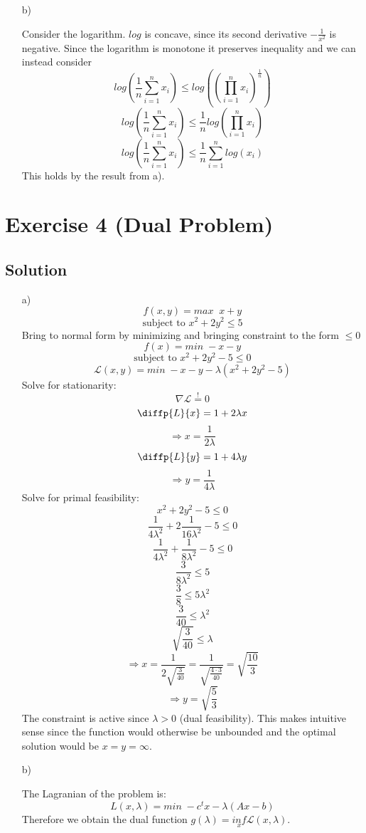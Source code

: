 \documentclass[10pt]{article}
\numberwithin{equation}{section}
\begin{document}
\begin{enumerate}
{}
\item[b)]{
    Consider the logarithm. $log$ is concave, since its second derivative $-\frac{1}{x^2}$ is negative.
    Since the logarithm is monotone it preserves inequality and we can instead consider
    $$log(\frac{1}{n} \sum_{i=1}^{n}x_i) \leq log((\prod_{i=1}^n x_i)^{\frac{1}{n}})$$
    $$log(\frac{1}{n} \sum_{i=1}^{n}x_i) \leq \frac{1}{n} log(\prod_{i=1}^n x_i)$$
    $$log(\frac{1}{n} \sum_{i=1}^{n}x_i) \leq \frac{1}{n} \sum_{i=1}^n log(x_i)$$
    This holds by the result from a).

}
\end{enumerate}

\section*{Exercise 4 (Dual Problem)}
\subsection*{Solution}
\begin{enumerate}
\item[a)]{
    $$ f(x, y) = max\;\; x+y$$
    $$\text{subject to } x^2 +2y^2 \leq 5$$
    Bring to normal form by minimizing and bringing constraint to the form $\leq 0$
    $$ f(x) = min\;  -x-y$$
    $$\text{subject to } x^2 + 2y^2 - 5 \leq 0$$
    $$\mathcal{L}(x,y) = min\; -x-y - \lambda (x^2 + 2y^2 -5)$$
    Solve for stationarity: 
    $$\nabla \mathcal{L} \overset{!}{=} 0$$
    $$\diffp{L}{x} = 1 + 2\lambda x$$
    $$\Rightarrow x  = \frac{1}{2\lambda}$$
    $$\diffp{L}{y} = 1 + 4\lambda y$$
    $$\Rightarrow y  = \frac{1}{4\lambda}$$
    Solve for primal feasibility:
    $$x^2 + 2y^2 -5 \leq 0$$
    $$\frac{1}{4\lambda^2} + 2\frac{1}{16\lambda^2} -5 \leq 0$$
    $$\frac{1}{4\lambda^2} + \frac{1}{8\lambda^2} -5 \leq 0$$
    $$\frac{3}{8\lambda^2}  \leq 5$$
    $$\frac{3}{8}  \leq 5\lambda^2$$
    $$\frac{3}{40}  \leq \lambda^2$$
    $$\sqrt{\frac{3}{40}} \leq \lambda$$
    $$\Rightarrow x = \frac{1}{2\sqrt{\frac{3}{40}}} = \frac{1}{\sqrt{\frac{4  \cdot 3}{40}}}= \sqrt{\frac{10}{3}}$$
    $$ \Rightarrow y = \sqrt{\frac{5}{3}}$$
    The constraint is active since $\lambda > 0$ (dual feasibility).
    This makes intuitive sense since the function would otherwise be unbounded and the optimal solution would be $x = y = \infty$.
}
\item[b)]{
    The Lagranian of the problem is:
    $$L(x,\lambda) = min \; -c^t x - \lambda (Ax-b)$$
    Therefore we obtain the dual function $g(\lambda) = \underset{x}{inf} \mathcal{L}(x,\lambda)$.
    

}
\end{enumerate}
\end{document}
